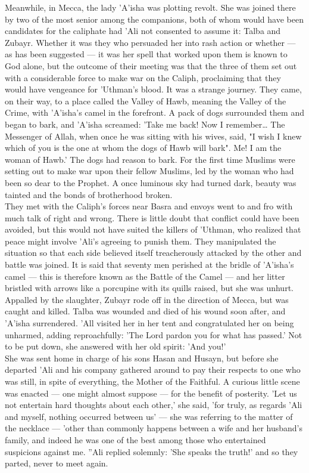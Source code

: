 \documentclass[11pt, b5paper, twoside]{book}
\begin{document}
Meanwhile, in Mecca, the lady 'A'isha was plotting revolt. She was joined there by two of the most senior among the companions, both of whom would have been candidates for the caliphate had 'Ali not consented to assume it: Talba and Zubayr. Whether it was they who persuaded her into rash action or whether --- as has been suggested --- it was her spell that worked upon them is known to God alone, but the outcome of their meeting was that the three of them set out with a considerable force to make war on the Caliph, proclaiming that they would have vengeance for 'Uthman's blood. It was a strange journey. They came, on their way, to a place called the Valley of Hawb, meaning the Valley of the Crime, with 'A'isha's camel in the forefront. A pack of dogs surrounded them and began to bark, and 'A'isha screamed: 'Take me back! Now I remember\ldots{} The Messenger of Allah, when once he was sitting with his wives, said, "I wish I knew which of you is the one at whom the dogs of Hawb will bark". Me! I am the woman of Hawb.' The dogs had reason to bark. For the first time Muslims were setting out to make war upon their fellow Muslims, led by the woman who had been so dear to the Prophet. A once luminous sky had turned dark, beauty was tainted and the bonds of brotherhood broken. \\

They met with the Caliph's forces near Basra and envoys went to and fro with much talk of right and wrong. There is little doubt that conflict could have been avoided, but this would not have suited the killers of 'Uthman, who realized that peace might involve 'Ali's agreeing to punish them. They manipulated the situation so that each side believed itself treacherously attacked by the other and battle was joined. It is said that seventy men perished at the bridle of 'A'isha's camel --- this is therefore known as the Battle of the Camel --- and her litter bristled with arrows like a porcupine with its quills raised, but she was unhurt. Appalled by the slaughter, Zubayr rode off in the direction of Mecca, but was caught and killed. Talba was wounded and died of his wound soon after, and 'A'isha surrendered. 'All visited her in her tent and congratulated her on being unharmed, adding reproachfully: 'The Lord pardon you for what has passed.' Not to be put down, she answered with her old spirit: 'And you!' \\

She was sent home in charge of his sons Hasan and Husayn, but before she departed 'Ali and his company gathered around to pay their respects to one who was still, in spite of everything, the Mother of the Faithful. A curious little scene was enacted --- one might almost suppose --- for the benefit of posterity. 'Let us not entertain hard thoughts about each other,' she said, 'for truly, as regards 'Ali and myself, nothing occurred between us' --- she was referring to the matter of the necklace --- 'other than commonly happens between a wife and her husband's family, and indeed he was one of the best among those who entertained suspicions against me. ''Ali replied solemnly: 'She speaks the truth!' and so they parted, never to meet again. \\
\end{document}
